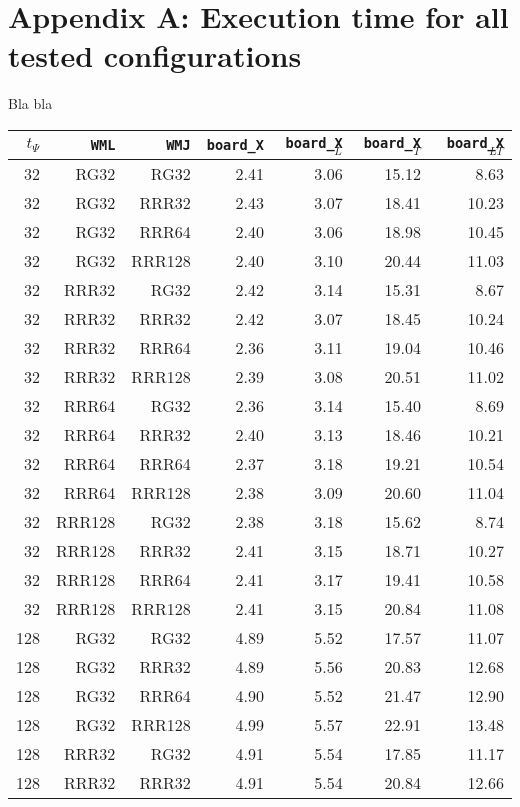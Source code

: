 \appendix
\chapter*{Appendix A: Execution time for all tested configurations}
\label{app:times}
Bla bla

\begin{table}
\begin{tabular}{|r|r|r|r|r|r|r|}
\hline
$t_{\Psi}$ & \texttt{WML} & \texttt{WMJ} & \texttt{board\_X} & \texttt{board\_X$_{L}$} & \texttt{board\_X$_{T}$} & \texttt{board\_X$_{LT}$} \\
\hline
32 & RG32 & RG32 & 2.41 & 3.06 & 15.12 & 8.63 \\
32 & RG32 & RRR32 & 2.43 & 3.07 & 18.41 & 10.23 \\
32 & RG32 & RRR64 & 2.40 & 3.06 & 18.98 & 10.45 \\
32 & RG32 & RRR128 & 2.40 & 3.10 & 20.44 & 11.03 \\
32 & RRR32 & RG32 & 2.42 & 3.14 & 15.31 & 8.67 \\
32 & RRR32 & RRR32 & 2.42 & 3.07 & 18.45 & 10.24 \\
32 & RRR32 & RRR64 & 2.36 & 3.11 & 19.04 & 10.46 \\
32 & RRR32 & RRR128 & 2.39 & 3.08 & 20.51 & 11.02 \\
32 & RRR64 & RG32 & 2.36 & 3.14 & 15.40 & 8.69 \\
32 & RRR64 & RRR32 & 2.40 & 3.13 & 18.46 & 10.21 \\
32 & RRR64 & RRR64 & 2.37 & 3.18 & 19.21 & 10.54 \\
32 & RRR64 & RRR128 & 2.38 & 3.09 & 20.60 & 11.04 \\
32 & RRR128 & RG32 & 2.38 & 3.18 & 15.62 & 8.74 \\
32 & RRR128 & RRR32 & 2.41 & 3.15 & 18.71 & 10.27 \\
32 & RRR128 & RRR64 & 2.41 & 3.17 & 19.41 & 10.58 \\
32 & RRR128 & RRR128 & 2.41 & 3.15 & 20.84 & 11.08 \\
128 & RG32 & RG32 & 4.89 & 5.52 & 17.57 & 11.07 \\
128 & RG32 & RRR32 & 4.89 & 5.56 & 20.83 & 12.68 \\
128 & RG32 & RRR64 & 4.90 & 5.52 & 21.47 & 12.90 \\
128 & RG32 & RRR128 & 4.99 & 5.57 & 22.91 & 13.48 \\
128 & RRR32 & RG32 & 4.91 & 5.54 & 17.85 & 11.17 \\
128 & RRR32 & RRR32 & 4.91 & 5.54 & 20.84 & 12.66 \\

\end{tabular}
\end{table}
